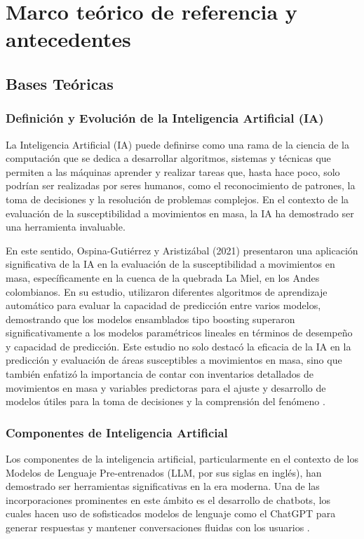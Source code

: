 \section{Marco teórico de referencia y antecedentes}
\subsection{Bases Teóricas}

\subsubsection{Definición y Evolución de la Inteligencia Artificial (IA)}
La Inteligencia Artificial (IA) puede definirse como una rama de la ciencia de la computación que se dedica a desarrollar algoritmos, sistemas y técnicas que permiten a las máquinas aprender y realizar tareas que, hasta hace poco, solo podrían ser realizadas por seres humanos, como el reconocimiento de patrones, la toma de decisiones y la resolución de problemas complejos. En el contexto de la evaluación de la susceptibilidad a movimientos en masa, la IA ha demostrado ser una herramienta invaluable.

En este sentido, Ospina-Gutiérrez y Aristizábal (2021) presentaron una aplicación significativa de la IA en la evaluación de la susceptibilidad a movimientos en masa, específicamente en la cuenca de la quebrada La Miel, en los Andes colombianos. En su estudio, utilizaron diferentes algoritmos de aprendizaje automático para evaluar la capacidad de predicción entre varios modelos, demostrando que los modelos ensamblados tipo boosting superaron significativamente a los modelos paramétricos lineales en términos de desempeño y capacidad de predicción. Este estudio no solo destacó la eficacia de la IA en la predicción y evaluación de áreas susceptibles a movimientos en masa, sino que también enfatizó la importancia de contar con inventarios detallados de movimientos en masa y variables predictoras para el ajuste y desarrollo de modelos útiles para la toma de decisiones y la comprensión del fenómeno \citep{Ospina2021AplicacionMasa}.

\subsubsection{Componentes de Inteligencia Artificial}
Los componentes de la inteligencia artificial, particularmente en el contexto de los Modelos de Lenguaje Pre-entrenados (LLM, por sus siglas en inglés), han demostrado ser herramientas significativas en la era moderna. Una de las incorporaciones prominentes en este ámbito es el desarrollo de chatbots, los cuales hacen uso de sofisticados modelos de lenguaje como el ChatGPT para generar respuestas y mantener conversaciones fluidas con los usuarios \citep{Zamfirescu-Pereira2023WhyPrompts}.


